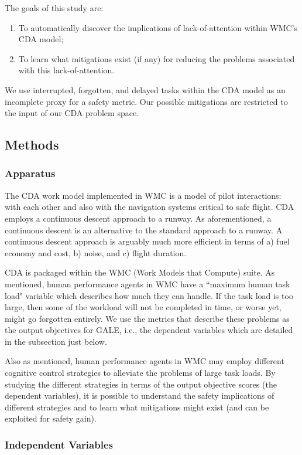 \documentclass[journal]{IEEEtran}
\newcommand{\be}{\begin{enumerate}}
\newcommand{\ee}{\end{enumerate}}
\newcommand{\ADD}[1]{#1}
\begin{document}
The goals of this study are:
\be
\item
To automatically discover the implications of lack-of-attention within WMC's CDA model;
\item
To learn what mitigations exist (if any) for reducing the problems associated with this lack-of-attention.
\ee
\ADD{We use interrupted, forgotten, and delayed tasks within the CDA model as an incomplete proxy for a safety metric.
Our possible mitigations are restricted to the input of our CDA problem space.}


\subsection{Methods}
\subsubsection{Apparatus}

 
The CDA work model implemented in WMC is a model of pilot interactions: with each other and also with the navigation systems critical to safe flight.  
CDA employs a continuous descent approach to a runway. 
As aforementioned, a continuous descent is an alternative to the standard approach to a runway.
A continuous descent approach is arguably much more efficient in terms of a) fuel economy and cost, b) noise, and c) flight duration.

CDA is packaged within the WMC (Work Models that Compute) suite.  
As mentioned, human performance agents in WMC have a ``maximum human task load" variable which describes how much they can handle.  
If the task load is too large, then some of the workload will not be completed in time, or worse yet, might go forgotten entirely.  
We use the metrics that describe these problems as the output objectives for GALE, i.e., the dependent variables which are detailed in the subsection just below.

Also as mentioned, human performance agents in WMC may employ different cognitive
control strategies to alleviate the problems of large task loads.   
By studying the different strategies in terms of the output objective scores (the dependent variables), it is possible to understand the safety implications of different strategies and to learn what mitigations might exist (and can be exploited for safety gain).


\subsubsection{Independent Variables}
\end{document}
